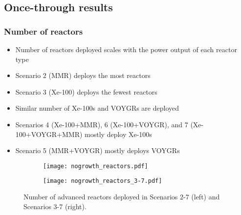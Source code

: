 \subsection{Once-through results}

\begin{frame}
    \frametitle{Number of reactors}
            \begin{itemize}
                \item Number of reactors deployed scales with the power 
                      output of each reactor type
                \item Scenario 2 (MMR) deploys the most reactors
                \item Scenario 3 (Xe-100) deploys the fewest reactors
                \item Similar number of Xe-100s and VOYGRs are deployed
                \item Scenarios 4 (Xe-100+MMR), 6 (Xe-100+VOYGR), and 7 
                      (Xe-100+VOYGR+MMR) mostly deploy Xe-100s 
                \item Scenario 5 (MMR+VOYGR) mostly deploys VOYGRs
            \end{itemize}
        \begin{figure}
        \begin{subfigure}{0.48\textwidth}
                \centering
                \texttt{[image: nogrowth\_reactors.pdf]}
        \end{subfigure}
        \hfill
        \begin{subfigure}{0.48\textwidth}
            \centering
            \texttt{[image: nogrowth\_reactors\_3-7.pdf]}
        \end{subfigure}
        \vspace{-0.15cm}
        \caption{Number of advanced reactors deployed in Scenarios 2-7 (left)
        and Scenarios 3-7 (right).}
        \end{figure}
\end{frame}

